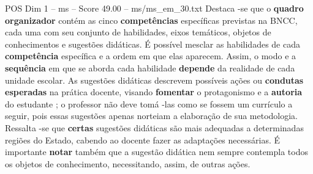 \begin{textsample}{POS Dim 1 – ms – Score 49.00 – ms/ms\_em\_30.txt}
Destaca -se que o \textbf{quadro} \textbf{organizador} contém as cinco \textbf{competências} específicas previstas na BNCC, cada uma com seu conjunto de habilidades, eixos temáticos, objetos de conhecimentos e sugestões didáticas.
É possível mesclar as habilidades de cada \textbf{competência} específica e a ordem em que elas aparecem.
Assim, o modo e a \textbf{sequência} em que se aborda cada habilidade \textbf{depende} da realidade de cada unidade escolar.
As sugestões didáticas descrevem possíveis ações ou \textbf{condutas} \textbf{esperadas} na prática docente, visando \textbf{fomentar} o protagonismo e a \textbf{autoria} do estudante ; o professor não deve tomá -las como se fossem um currículo a seguir, pois essas sugestões apenas norteiam a elaboração de sua metodologia.
Ressalta -se que \textbf{certas} sugestões didáticas são mais adequadas a determinadas regiões do Estado, cabendo ao docente fazer as adaptações necessárias.
É importante \textbf{notar} também que a sugestão didática nem sempre contempla todos os objetos de conhecimento, necessitando, assim, de outras ações.

\end{textsample}
